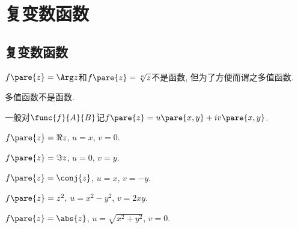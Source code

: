 \documentclass[../ComplexVariable.tex]{subfiles}
\begin{document}
\section{复变数函数} %
\label{sec:复变数函数}

\subsection{复变数函数} %
\label{sub:复变数函数}

\begin{ex}
    $f\pare{z} = \Arg z$和$f\pare{z} = \sqrt[n]{z}$不是函数, 但为了方便而谓之多值函数.
\end{ex}
\begin{pitfall}
    多值函数不是函数.
\end{pitfall}
一般对$\func{f}{A}{B}$记$f\pare{z} = u\pare{x,y} + iv\pare{x,y}$.
\begin{sample}
    \begin{ex}
        $f\pare{z} = \Re z$, $u=x$, $v=0$.
    \end{ex}
    \begin{ex}
        $f\pare{z} = \Im z$, $u=0$, $v=y$.
    \end{ex}
    \begin{ex}
        $f\pare{z} = \conj{z}$, $u=x$, $v=-y$.
    \end{ex}
    \begin{ex}
        $f\pare{z} = z^2,$ $u = x^2-y^2$, $v=2xy$.
    \end{ex}
    \begin{ex}
        $f\pare{z} = \abs{z}$, $u = \sqrt{x^2+y^2}$, $v = 0$.
    \end{ex}
\end{sample}
\end{document}
